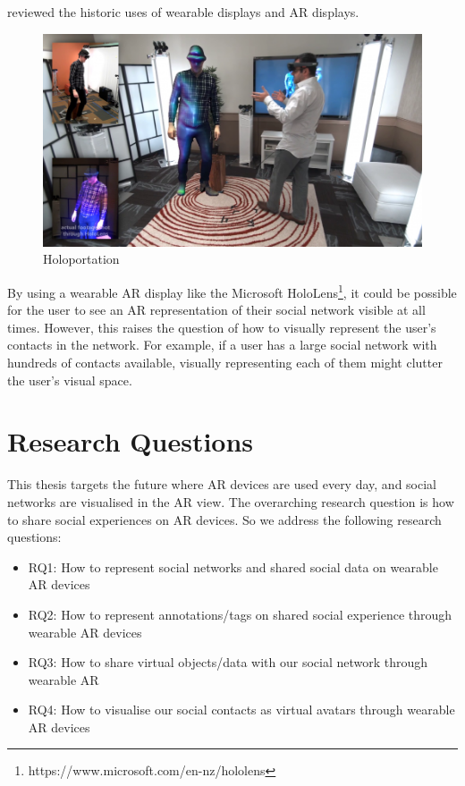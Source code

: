 \cite{Peddie2017} reviewed the historic uses of wearable displays and AR displays. 

\begin{figure}
    \centering
    \includegraphics[width=.8\linewidth]{images/holoportation.png}
    \caption{Holoportation}
    \label{fig:holoportation}
\end{figure}

By using a wearable AR display like the Microsoft HoloLens\footnote{https://www.microsoft.com/en-nz/hololens}, it could be possible for the user to see an AR representation of their social network visible at all times. However, this raises the question of how to visually represent the user's contacts in the network. For example, if a user has a large social network with hundreds of contacts available, visually representing each of them might clutter the user's visual space.

\section{Research Questions}

This thesis targets the future where AR devices are used every day, and social networks are visualised in the AR view. The overarching research question is how to share social experiences on AR devices. So we address the following research questions: 

\begin{itemize}
    \item {RQ1: How to represent social networks and shared social data on wearable AR devices}
    
    \item{RQ2: How to represent annotations/tags on shared social experience through wearable AR devices}
    
    \item{RQ3: How to share virtual objects/data with our social network through wearable AR}
    
    \item{RQ4: How to visualise our social contacts as virtual avatars through wearable AR devices}

\end{itemize}

